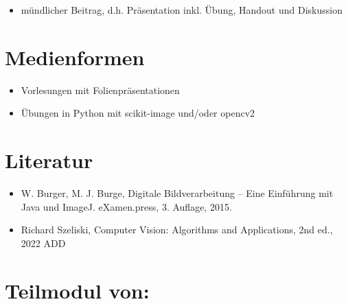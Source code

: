 \begin{itemize}
\tightlist
\item
  mündlicher Beitrag, d.h. Präsentation inkl. Übung, Handout und
  Diskussion
\end{itemize}

\hypertarget{medienformenpathlabelmi-2017modulbeschreibungen-bachelorba_vc-bildverarbeitung-und-computer-vision}{%
\section*{Medienformen\label{/mi-2017/modulbeschreibungen-bachelor/BA_VC-bildverarbeitung-und-computer-vision}}\label{medienformenpathlabelmi-2017modulbeschreibungen-bachelorba_vc-bildverarbeitung-und-computer-vision}}

\begin{itemize}
\tightlist
\item
  Vorlesungen mit Folienpräsentationen
\item
  Übungen in Python mit scikit-image und/oder opencv2
\end{itemize}

\hypertarget{literaturpathlabelmi-2017modulbeschreibungen-bachelorba_vc-bildverarbeitung-und-computer-vision}{%
\section*{Literatur\label{/mi-2017/modulbeschreibungen-bachelor/BA_VC-bildverarbeitung-und-computer-vision}}\label{literaturpathlabelmi-2017modulbeschreibungen-bachelorba_vc-bildverarbeitung-und-computer-vision}}

\begin{itemize}
\tightlist
\item
  W. Burger, M. J. Burge, Digitale Bildverarbeitung -- Eine Einführung
  mit Java und ImageJ. eXamen.press, 3. Auflage, 2015.
\item
  Richard Szeliski, Computer Vision: Algorithms and Applications, 2nd
  ed., 2022 ADD
\end{itemize}

\hypertarget{teilmodul-vonpathlabelmi-2017modulbeschreibungen-bachelorba_vc-bildverarbeitung-und-computer-vision}{%
\section*{Teilmodul
von:\label{/mi-2017/modulbeschreibungen-bachelor/BA_VC-bildverarbeitung-und-computer-vision}}\label{teilmodul-vonpathlabelmi-2017modulbeschreibungen-bachelorba_vc-bildverarbeitung-und-computer-vision}}

